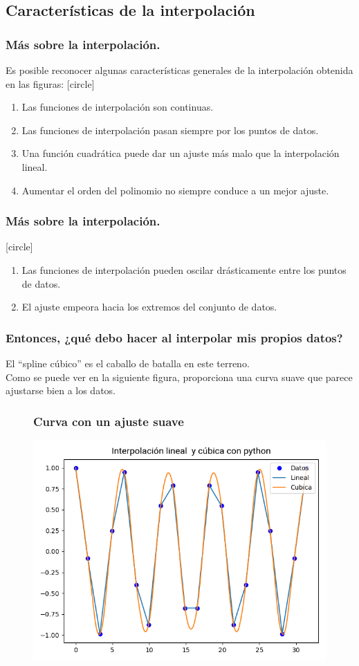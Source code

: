 {\subsection{Características de la interpolación}
\begin{frame}
\frametitle{Más sobre la interpolación.}
Es posible reconocer algunas características generales de la interpolación obtenida en las figuras:
[circle]
\begin{enumerate}[<+->]
\item Las funciones de interpolación son continuas.
\item Las funciones de interpolación pasan siempre por los puntos de datos.
\item Una función cuadrática puede dar un ajuste más malo que la interpolación lineal.
\item Aumentar el orden del polinomio no siempre conduce a un mejor ajuste.
\seti
\end{enumerate}
\end{frame}
\begin{frame}
\frametitle{Más sobre la interpolación.}
[circle]
\begin{enumerate}[<+->]
\conti
\item Las funciones de interpolación pueden oscilar drásticamente entre los puntos de datos.
\item El ajuste empeora hacia los extremos del conjunto de datos.
\end{enumerate}
\end{frame}
\begin{frame}
\frametitle{Entonces, ¿qué debo hacer al interpolar mis propios datos?}
El \enquote{spline cúbico} es el caballo de batalla en este terreno.
\\
\bigskip
Como se puede ver en la siguiente figura, proporciona una curva suave que parece ajustarse bien a los datos.
\end{frame}
\begin{frame}
\begin{figure}
\frametitle{Curva con un ajuste suave}
\centering
\includegraphics[scale=0.4]{Imagenes/interpolacion_03b}

\end{figure}
\end{frame}}
